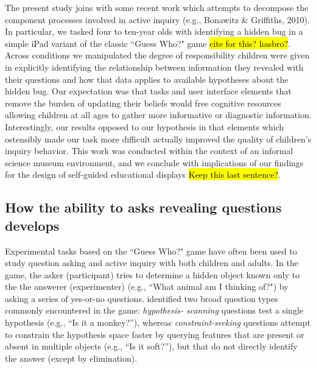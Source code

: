 \documentclass[10pt,letterpaper]{article}
\begin{document}
\nocite{Bonawitz:2010pb}
The present study joins with some recent work which attempts to decompose the 
component processes involved in active inquiry (e.g., Bonawitz \& Griffiths, 2010).  
In particular, we tasked four to ten-year olds with identifying a hidden bug in
a simple iPad variant of the classic ``Guess Who?" game \hl{cite for this? hasbro?}.
Across conditions we manipulated the degree of responsibility children were given in explicitly 
identifying the relationship between information they revealed with their questions and 
how that data applies to available hypotheses about the hidden bug.  Our 
expectation was that tasks and user interface elements that  remove the burden of 
updating their beliefs would free cognitive resources allowing children at all ages to  
gather more informative or diagnostic information. 
Interestingly, our results opposed to our hypothesis in that elements which 
ostensibly made our task more difficult actually improved the quality of children's inquiry 
behavior.  
This work was conducted within the context of an informal science museum
environment, and we conclude with implications of our findings for the design of
self-guided educational displays \hl{Keep this last sentence?}.

\subsection{How the ability to asks revealing questions develops}

Experimental tasks based on the ``Guess Who?" game have often been used to
study question asking and active inquiry with both children and adults.
In the game, the asker (participant) tries to determine a hidden object known
only to the the answerer (experimenter) (e.g., ``What animal am I thinking of?")
by asking a series of yes-or-no questions.
 identified two broad question types commonly encountered in the game: \emph{hypothesis-
scanning} questions test a single hypothesis (e.g., ``Is it a monkey?''), whereas 
\emph{constraint-seeking} questions attempt to constrain the hypothesis space faster by 
querying features that are present or absent in multiple objects (e.g., ``Is it soft?''), 
but that do not directly identify the answer (except by elimination). 
\end{document}

